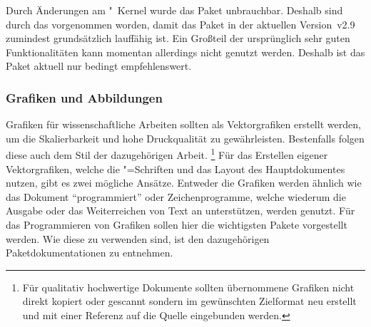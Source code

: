 \begin{packages}
  
  Durch Änderungen am "~Kernel wurde das Paket unbrauchbar. 
  Deshalb sind durch das  vorgenommen worden, damit das Paket in der aktuellen Version~v2.9 zumindest 
  grundsätzlich lauffähig ist. Ein Großteil der ursprünglich sehr guten 
  Funktionalitäten kann momentan allerdings nicht genutzt werden. Deshalb ist 
  das Paket aktuell nur bedingt empfehlenswert.
\end{packages}
%


\subsubsection{Grafiken und Abbildungen}
%
%
Grafiken für wissenschaftliche Arbeiten sollten als Vektorgrafiken erstellt 
werden, um die Skalierbarkeit und hohe Druckqualität zu gewährleisten. 
Bestenfalls folgen diese auch dem Stil der dazugehörigen Arbeit.%
\footnote{%
  Für qualitativ hochwertige Dokumente sollten übernommene Grafiken nicht 
  direkt kopiert oder gescannt sondern im gewünschten Zielformat neu erstellt 
  und mit einer Referenz auf die Quelle eingebunden werden.%
}
Für das Erstellen eigener Vektorgrafiken, welche die "=Schriften 
und das Layout des Hauptdokumentes nutzen, gibt es zwei mögliche Ansätze. 
Entweder die Grafiken werden ähnlich wie das Dokument \enquote{programmiert} 
oder Zeichenprogramme, welche wiederum die Ausgabe oder das Weiterreichen von 
Text an  unterstützen, werden genutzt. 
Für das Programmieren von Grafiken sollen hier die wichtigsten Pakete 
vorgestellt werden. Wie diese zu verwenden sind, ist den dazugehörigen 
Paketdokumentationen zu entnehmen. 

